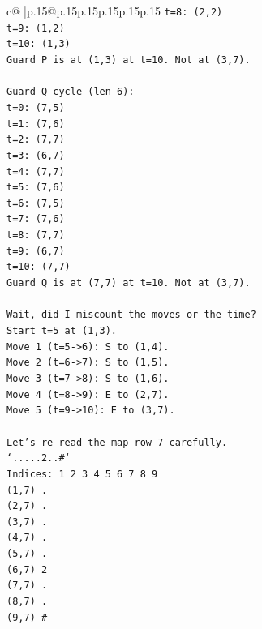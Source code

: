 \documentclass{article}
\begin{document}
{\begin{supertabular}{c@{$\;$}|p{.15\linewidth}@{}p{.15\linewidth}p{.15\linewidth}p{.15\linewidth}p{.15\linewidth}p{.15\linewidth}}
{{{\texttt{t=8: (2,2)} \\
\texttt{t=9: (1,2)} \\
\texttt{t=10: (1,3)} \\
\texttt{Guard P is at (1,3) at t=10. Not at (3,7).} \\
\\ 
\texttt{Guard Q cycle (len 6):} \\
\texttt{t=0: (7,5)} \\
\texttt{t=1: (7,6)} \\
\texttt{t=2: (7,7)} \\
\texttt{t=3: (6,7)} \\
\texttt{t=4: (7,7)} \\
\texttt{t=5: (7,6)} \\
\texttt{t=6: (7,5)} \\
\texttt{t=7: (7,6)} \\
\texttt{t=8: (7,7)} \\
\texttt{t=9: (6,7)} \\
\texttt{t=10: (7,7)} \\
\texttt{Guard Q is at (7,7) at t=10. Not at (3,7).} \\
\\ 
\texttt{Wait, did I miscount the moves or the time?} \\
\texttt{Start t=5 at (1,3).} \\
\texttt{Move 1 (t=5{-}>6): S to (1,4).} \\
\texttt{Move 2 (t=6{-}>7): S to (1,5).} \\
\texttt{Move 3 (t=7{-}>8): S to (1,6).} \\
\texttt{Move 4 (t=8{-}>9): E to (2,7).} \\
\texttt{Move 5 (t=9{-}>10): E to (3,7).} \\
\\ 
\texttt{Let's re{-}read the map row 7 carefully.} \\
\texttt{`.....2..\#`} \\
\texttt{Indices: 1 2 3 4 5 6 7 8 9} \\
\texttt{(1,7) .} \\
\texttt{(2,7) .} \\
\texttt{(3,7) .} \\
\texttt{(4,7) .} \\
\texttt{(5,7) .} \\
\texttt{(6,7) 2} \\
\texttt{(7,7) .} \\
\texttt{(8,7) .} \\
\texttt{(9,7) \#} \\
}}}
\end{supertabular}}
\end{document}
